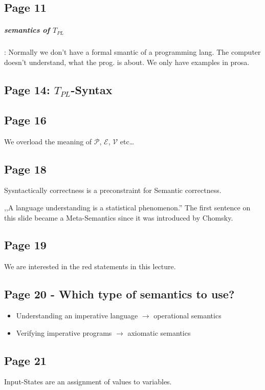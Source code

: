\documentclass[a4paper]{article}
\newcommand{\TPL}{T_{PL}}
\begin{document}
\subsection{Page 11}
\subparagraph{semantics of $\TPL$}: Normally we don't have a formal smantic of
a programming lang. The computer doesn't understand, what the prog. is about. We
only have examples in prosa.

\subsection{Page 14: $\TPL$-Syntax}

\subsection{Page 16}
We overload the meaning of $\mathcal{P}$, $\mathcal{E}$, $\mathcal{V}$ etc\ldots

\subsection{Page 18}
Sysntactically correctness is a preconstraint for Semantic correctness.

,,A language understanding is a statistical phenomenon.'' The first sentence on
this slide became a Meta-Semantics since it was introduced by Chomsky.

\subsection{Page 19}
We are interested in the red statements in this lecture.

\subsection{Page 20 - Which type of semantics to use?}

\begin{itemize}
\item Understanding an imperative language $\rightarrow$ operational semantics
\item Verifying imperative programs $\rightarrow$ axiomatic semantics
\end{itemize}



\subsection{Page 21}
Input-States are an assignment of values to variables.
\end{document}
